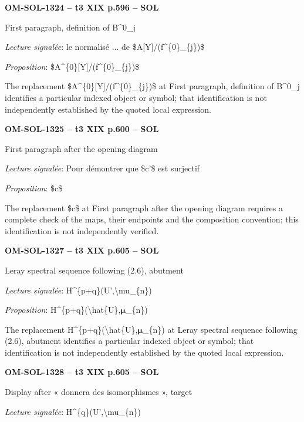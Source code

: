 \par\noindent\textbf{OM-SOL-1324 -- t3 XIX p.596 -- SOL}\par
First paragraph, definition of B\textasciicircum{}0\_j\par
\emph{Lecture signalée}: le normalisé ... de \$A[Y]/(f\textasciicircum{}\{0\}\_\{j\})\$\par
\emph{Proposition}: \$A\textasciicircum{}\{0\}[Y]/(f\textasciicircum{}\{0\}\_\{j\})\$\par
The replacement \$A\textasciicircum{}\{0\}[Y]/(f\textasciicircum{}\{0\}\_\{j\})\$ at First paragraph, definition of B\textasciicircum{}0\_j identifies a particular indexed object or symbol; that identification is not independently established by the quoted local expression.\par
\par\noindent\textbf{OM-SOL-1325 -- t3 XIX p.600 -- SOL}\par
First paragraph after the opening diagram\par
\emph{Lecture signalée}: Pour démontrer que \$c'\$ est surjectif\par
\emph{Proposition}: \$c\$\par
The replacement \$c\$ at First paragraph after the opening diagram requires a complete check of the maps, their endpoints and the composition convention; this identification is not independently verified.\par
\par\noindent\textbf{OM-SOL-1327 -- t3 XIX p.605 -- SOL}\par
Leray spectral sequence following (2.6), abutment\par
\emph{Lecture signalée}: H\textasciicircum{}\{p+q\}(U',\textbackslash{}mu\_\{n\})\par
\emph{Proposition}: H\textasciicircum{}\{p+q\}(\textbackslash{}hat\{U\},\ensuremath{𝛍}\_\{n\})\par
The replacement H\textasciicircum{}\{p+q\}(\textbackslash{}hat\{U\},\ensuremath{𝛍}\_\{n\}) at Leray spectral sequence following (2.6), abutment identifies a particular indexed object or symbol; that identification is not independently established by the quoted local expression.\par
\par\noindent\textbf{OM-SOL-1328 -- t3 XIX p.605 -- SOL}\par
Display after « donnera des isomorphismes », target\par
\emph{Lecture signalée}: H\textasciicircum{}\{q\}(U',\textbackslash{}mu\_\{n\})\par

